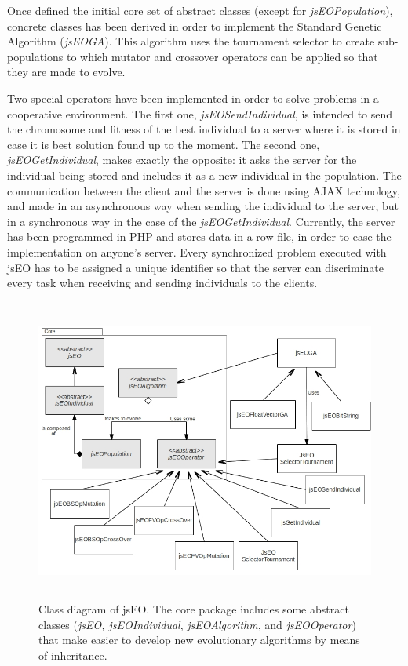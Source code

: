 \documentclass[runningheads,a4paper]{llncs}
\begin{document}
Once defined the initial core set of abstract classes (except for \textit{jsEOPopulation}), concrete classes has been derived in order to implement the Standard Genetic Algorithm (\textit{jsEOGA}). This algorithm uses the tournament selector to create sub-populations to which mutator and crossover operators can be applied so that they are made to evolve.

Two special operators have been implemented in order to solve problems in a cooperative environment. The first one, \textit{jsEOSendIndividual}, is intended to send the chromosome and fitness of the best individual to a server where it is stored in case it is best solution found up to the moment. The second one, \textit{jsEOGetIndividual}, makes exactly the opposite: it asks the server for the individual being stored and includes it as a new individual in the population. The communication between the client and the server is done using AJAX technology, and made in an asynchronous way when sending the individual to the server, but in a synchronous way in the case of the \textit{jsEOGetIndividual}. Currently, the server has been programmed in PHP and stores data in a row file, in order to ease the implementation on anyone's server. Every synchronized problem executed with jsEO has to be assigned a unique identifier so that the server can discriminate every task when receiving and sending individuals to the clients.

\begin{figure}
\centering
\includegraphics[height=10cm]{class-diagram}
\caption{Class diagram of jsEO. The core package includes some abstract classes (\textit{jsEO, jsEOIndividual}, \textit{jsEOAlgorithm}, and \textit{jsEOOperator}) that make easier to develop new evolutionary algorithms by means of inheritance.}
\label{fig:jsEO-class-diagram}
\end{figure}
\end{document}
